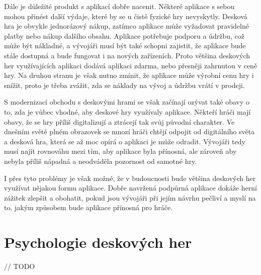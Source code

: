 Dále je důležité produkt s aplikací dobře nacenit. Některé aplikace s sebou mohou přinést další výdaje, které by se u čistě fyzické hry nevyskytly. Desková hra je obvykle jednorázový nákup, zatímco aplikace může vyžadovat pravidelné platby nebo nákup dalšího obsahu. Aplikace potřebuje podporu a údržbu, což může být nákladné, a vývojáři musí být také schopni zajistit, že aplikace bude stále dostupná a bude fungovat i na nových zařízeních. Proto většina deskových her využívajících aplikaci dodává aplikaci zdarma, nebo přesněji zahrnutou v ceně hry. Na druhou stranu je však nutno zmínit, že aplikace může výrobní cenu hry i snížit, proto je třeba zvážit, zda se náklady na vývoj a údržbu vrátí v prodeji.

S modernizací obchodu s deskovými hrami se však začínají ozývat také obavy o to, zda je vůbec vhodné, aby deskové hry využívaly aplikace. Někteří hráči mají obavy, že se hry příliš digitalizují a ztrácejí tak svůj původní charakter. Ve dnešním světě plném obrazovek se mnozí hráči chtějí odpojit od digitálního světa a desková hra, která se až moc opírá o aplikaci je může odradit. Vývojáři tedy musí najít rovnováhu mezi tím, aby aplikace byla přínosná, ale zároveň aby nebyla příliš nápadná a neodváděla pozornost od samotné hry.

I přes tyto problémy je však možné, že v budoucnosti bude většina deskových her využívat nějakou formu aplikace. Dobře navržená podpůrná aplikace dokáže herní zážitek zlepšit a obohatit, pokud jsou vývojáři při jejím návrhu pečliví a myslí na to, jakým způsobem bude aplikace přínosná pro hráče.



\section{Psychologie deskových her}
\label{sec:psychology}

// TODO
